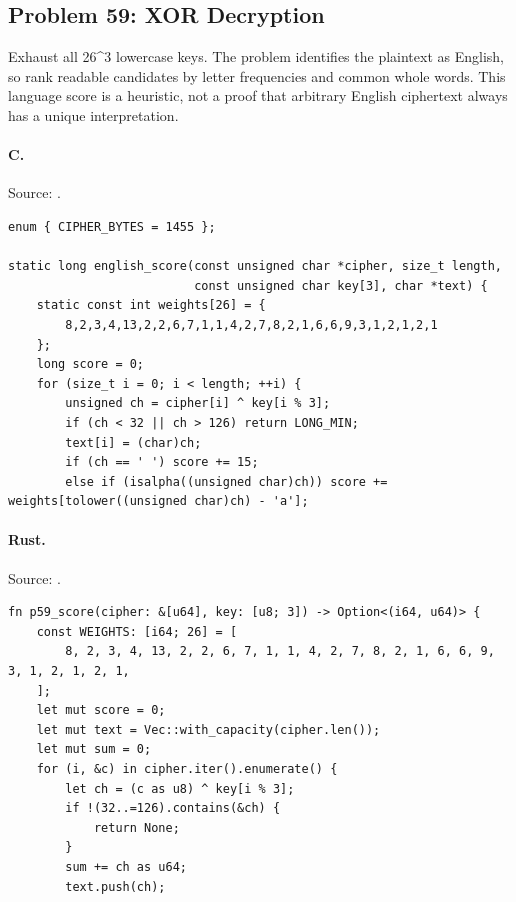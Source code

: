 \subsection{Problem 59: XOR Decryption}
\label{walkthrough:p59}
Exhaust all 26\textasciicircum{}3 lowercase keys. The problem identifies the plaintext as English, so rank readable candidates by letter frequencies and common whole words. This language score is a heuristic, not a proof that arbitrary English ciphertext always has a unique interpretation.

\paragraph{C.} Source: .
\begin{lstlisting}
enum { CIPHER_BYTES = 1455 };

static long english_score(const unsigned char *cipher, size_t length,
                          const unsigned char key[3], char *text) {
    static const int weights[26] = {
        8,2,3,4,13,2,2,6,7,1,1,4,2,7,8,2,1,6,6,9,3,1,2,1,2,1
    };
    long score = 0;
    for (size_t i = 0; i < length; ++i) {
        unsigned ch = cipher[i] ^ key[i % 3];
        if (ch < 32 || ch > 126) return LONG_MIN;
        text[i] = (char)ch;
        if (ch == ' ') score += 15;
        else if (isalpha((unsigned char)ch)) score += weights[tolower((unsigned char)ch) - 'a'];
\end{lstlisting}

\paragraph{Rust.} Source: .
\begin{lstlisting}
fn p59_score(cipher: &[u64], key: [u8; 3]) -> Option<(i64, u64)> {
    const WEIGHTS: [i64; 26] = [
        8, 2, 3, 4, 13, 2, 2, 6, 7, 1, 1, 4, 2, 7, 8, 2, 1, 6, 6, 9, 3, 1, 2, 1, 2, 1,
    ];
    let mut score = 0;
    let mut text = Vec::with_capacity(cipher.len());
    let mut sum = 0;
    for (i, &c) in cipher.iter().enumerate() {
        let ch = (c as u8) ^ key[i % 3];
        if !(32..=126).contains(&ch) {
            return None;
        }
        sum += ch as u64;
        text.push(ch);
\end{lstlisting}

